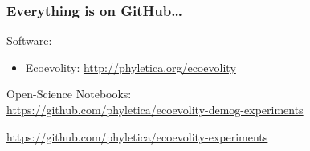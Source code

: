 \begin{frame}
    \frametitle{Everything is on GitHub\ldots}
    Software:\\
    \begin{itemize}
        \item Ecoevolity: \url{http://phyletica.org/ecoevolity}
    \end{itemize}

    \medskip
    Open-Science Notebooks:\\

    \url{https://github.com/phyletica/ecoevolity-demog-experiments}

    \url{https://github.com/phyletica/ecoevolity-experiments}
\end{frame}

